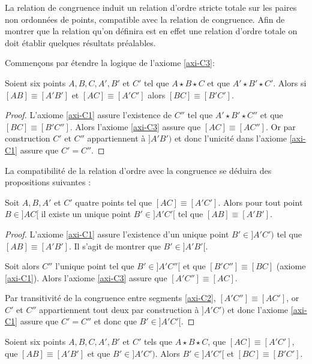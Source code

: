La relation de congruence induit un relation d'ordre stricte totale sur les paires non ordonnées de points, compatible avec la relation de congruence. Afin de montrer que la relation qu'on définira est en effet une relation d'ordre totale on doit établir quelques résultats préalables.

Commençons par étendre la logique de l'axiome \ref{axi-C3}:
\begin{prop}
     Soient six points $A,B,C,A',B'$ et $C'$ tel que $A \star B \star C$ et que $A' \star B' \star C'$. Alors si $[AB]\equiv [A'B']$ et $[AC]\equiv [A'C']$ alors $[BC]\equiv [B'C']$.
\begin{proof}
    L'axiome \ref{axi-C1} assure l'existence de $C''$ tel que $A'\star B' \star C''$ et que $[BC]\equiv [B'C'']$. Alors l'axiome \ref{axi-C3} assure que $[AC]\equiv [AC'']$. Or par construction $C'$ et $C''$ appartiennent à $]A'B')$ et donc l'unicité dans l'axiome \ref{axi-C1} assure que $C'=C''$.
\end{proof}
\end{prop}
La compatibilité de la relation d'ordre avec la congruence se déduira des propositions suivantes :
\begin{prop}\label{prop-inegcongcomp}
    Soit $A,B,A'$ et $C'$ quatre points tel que $[AC]\equiv [A'C']$. Alors pour tout point $B\in ]AC[$ il existe un unique point $B'\in ]A'C'[$ tel que $[AB]\equiv [A'B']$.
\begin{proof}
    L'axiome \ref{axi-C1} assure l'existence d'un unique point $B'\in]A'C')$ tel que $[AB] \equiv [A'B']$. Il s'agit de montrer que $B'\in ]A'B'[$. 

    Soit alors $C''$ l'unique point tel que $B'\in]A'C''[$ et que $[B'C'']\equiv[BC]$ (axiome \ref{axi-C1}). Alors l'axiome \ref{axi-C3} assure que $[A'C'']\equiv[AC]$.

    Par transitivité de la congruence entre segments \ref{axi-C2}, $[A'C'']\equiv[AC']$, or $C'$ et $C''$ appartiennent tout deux par construction à $]A'C')$ et donc l'axiome \ref{axi-C1} assure que $C'=C''$ et donc que $B'\in]A'C'[$.
\end{proof}
\end{prop}
\begin{cor}\label{cor-dedanssipluspetit}
    Soient six points $A,B,C,A',B'$ et $C'$ tels que $A \star B \star C$, que $[AC]\equiv [A'C']$, que $[AB]\equiv [A'B']$ et que $B'\in ]A'C')$. Alors $B' \in ]A'C'[$ et $[BC]\equiv [B' C']$. 
\end{cor}


